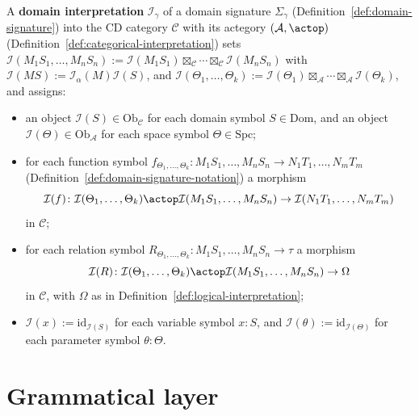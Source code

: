 \begin{definition}
\label{def:domain-interpretation}
\leanok
A \textbf{domain interpretation} $\mathcal I_\gamma$ of a domain
signature $\Sigma_\gamma$ (Definition~\ref{def:domain-signature}) into
the CD category $\mathcal C$ with its actegory $(\mathcal A, \actop)$
(Definition~\ref{def:categorical-interpretation}) sets
$\mathcal I(M_1 S_1,\ldots,M_n S_n) := \mathcal I(M_1 S_1)
\boxtimes_{\mathcal C} \cdots \boxtimes_{\mathcal C} \mathcal I(M_n S_n)$
with $\mathcal I(MS) := \mathcal I_\alpha(M)\mathcal I(S)$, and
$\mathcal I(\Theta_1,\ldots,\Theta_k) := \mathcal I(\Theta_1)
\boxtimes_{\mathcal A} \cdots \boxtimes_{\mathcal A} \mathcal I(\Theta_k)$,
and assigns:
\begin{itemize}
\item an object $\mathcal I(S) \in \mathrm{Ob}_{\mathcal C}$ for each
  domain symbol $S \in \mathrm{Dom}$, and an object
  $\mathcal I(\Theta) \in \mathrm{Ob}_{\mathcal A}$ for each space
  symbol $\Theta \in \mathrm{Spc}$;
\item for each function symbol
  $f_{\Theta_1,\ldots,\Theta_k} \colon M_1 S_1,\ldots,M_n S_n \to N_1
  T_1,\ldots,N_m T_m$ (Definition~\ref{def:domain-signature-notation}) a
  morphism
  \[
    \mathcal I(f) \colon \mathcal I(\Theta_1,\ldots,\Theta_k) \actop
    \mathcal I(M_1 S_1,\ldots,M_n S_n) \to \mathcal I(N_1 T_1,\ldots,N_m T_m)
  \]
  in $\mathcal C$;
\item for each relation symbol
  $R_{\Theta_1,\ldots,\Theta_k} \colon M_1 S_1,\ldots,M_n S_n \to \tau$
  a morphism
  \[
    \mathcal I(R) \colon \mathcal I(\Theta_1,\ldots,\Theta_k) \actop
    \mathcal I(M_1 S_1,\ldots,M_n S_n) \to \Omega
  \]
  in $\mathcal C$, with $\Omega$ as in
  Definition~\ref{def:logical-interpretation};
\item $\mathcal I(x) := \mathrm{id}_{\mathcal I(S)}$ for each variable
  symbol $x \colon S$, and $\mathcal I(\theta) := \mathrm{id}_{\mathcal
  I(\Theta)}$ for each parameter symbol $\theta \colon \Theta$.
\end{itemize}
\end{definition}

\section{Grammatical layer}  %
\label{sec:syntax-semantics}

